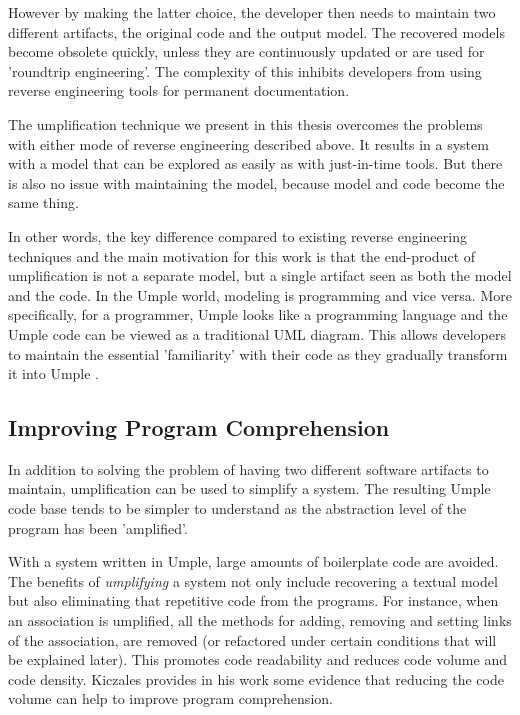 However by making the latter choice, the developer then needs to maintain two different artifacts, the original code and the output model. The recovered models become obsolete quickly, unless they are continuously updated or are used for 'roundtrip engineering'.  The complexity of this inhibits developers from using reverse engineering tools for permanent documentation.

The umplification technique we present in this thesis overcomes the problems with either mode of reverse engineering described above. It results in a system with a model that can be explored as easily as with just-in-time tools. But there is also no issue with maintaining the model, because model and code become the same thing.

In other words, the key difference compared to existing reverse engineering techniques and the main motivation for this work is that the end-product of umplification is not a separate model, but a single artifact seen as both the model and the code. In the Umple world, modeling is programming and vice versa. More specifically, for a programmer, Umple looks like a programming language and the Umple code can be viewed as a traditional UML diagram. This allows developers to maintain the essential 'familiarity' with their code as they gradually transform it into Umple \cite{Forward2008}. 

\subsection{Improving Program Comprehension}

In addition to solving the problem of having two different software artifacts to maintain,   umplification can be used to simplify a system. The resulting Umple code base tends to be simpler to understand \cite{UmpleMAIN} as the abstraction level of the program has been 'amplified'.

With a system written in Umple, large amounts of boilerplate code are avoided. The benefits of \textit{umplifying} a system not only include recovering a textual model but also eliminating that repetitive code from the programs. For instance, when an association is umplified, all the methods for adding, removing and setting links of the association, are removed (or refactored under certain conditions that will be explained later). This promotes code readability and reduces code volume and code density. Kiczales provides in his work \cite{kiczalesAOP} some evidence that reducing the code volume can help to improve program comprehension.

